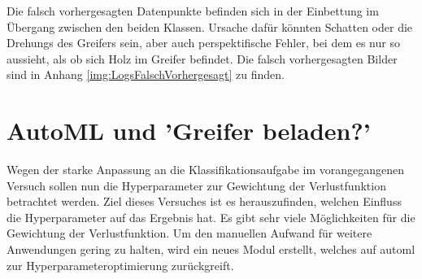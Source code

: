 	Die falsch vorhergesagten Datenpunkte befinden sich in der Einbettung im Übergang zwischen den beiden Klassen.  Ursache dafür könnten Schatten oder die Drehungs des Greifers sein, aber auch perspektifische Fehler, bei dem es nur so aussieht, als ob sich Holz im Greifer befindet. Die falsch vorhergesagten Bilder sind in Anhang \ref{img:LogsFalschVorhergesagt} zu finden.
		
	\section{AutoML und 'Greifer beladen?'}
	\label{sec:Transfer_autoMl}
	Wegen der starke Anpassung an die Klassifikationsaufgabe im vorangegangenen Versuch sollen nun die Hyperparameter zur Gewichtung der Verlustfunktion betrachtet werden. Ziel dieses Versuches ist es herauszufinden, welchen Einfluss die Hyperparameter auf das Ergebnis hat. Es gibt sehr viele Möglichkeiten für die Gewichtung der Verlustfunktion. Um den manuellen Aufwand für weitere Anwendungen gering zu halten, wird ein neues Modul erstellt, welches auf \ac{automl} zur Hyperparameteroptimierung zurückgreift.
	
